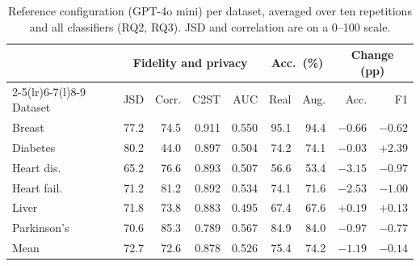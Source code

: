 \documentclass[conference]{IEEEtran}
\providecommand{\DIFaddbeginFL}{} %
\providecommand{\DIFaddendFL}{} %
\providecommand{\DIFdelbeginFL}{} %
\providecommand{\DIFdelendFL}{} %
\newcommand{\DIFscaledelfig}{0.5}
\newlength{\DIFdelgraphicswidth} %
\newlength{\DIFdelgraphicsheight} %
\newcommand{\DIFaddincludegraphics}[2][]{{\color{blue}\fbox{\DIFOincludegraphics[#1]{#2}}}} %
\newcommand{\DIFdelincludegraphics}[2][]{%
\sbox{\DIFdelgraphicsbox}{\DIFOincludegraphics[#1]{#2}}%
\settoboxwidth{\DIFdelgraphicswidth}{\DIFdelgraphicsbox} %
\settoboxtotalheight{\DIFdelgraphicsheight}{\DIFdelgraphicsbox} %
\scalebox{\DIFscaledelfig}{%
\parbox[b]{\DIFdelgraphicswidth}{\usebox{\DIFdelgraphicsbox}\\[-\baselineskip] \rule{\DIFdelgraphicswidth}{0em}}\llap{\resizebox{\DIFdelgraphicswidth}{\DIFdelgraphicsheight}{%
\setlength{\unitlength}{\DIFdelgraphicswidth}%
\begin{picture}(1,1)%
\thicklines\linethickness{2pt} %
{\color[rgb]{1,0,0}\put(0,0){\framebox(1,1){}}}%
{\color[rgb]{1,0,0}\put(0,0){\line( 1,1){1}}}%
{\color[rgb]{1,0,0}\put(0,1){\line(1,-1){1}}}%
\end{picture}%
}\hspace*{3pt}}} %
} %
\DeclareRobustCommand{\DIFaddbeginFL}{\DIFOaddbeginFL \let\includegraphics\DIFaddincludegraphics} %
\DeclareRobustCommand{\DIFaddendFL}{\DIFOaddendFL \let\includegraphics\DIFOincludegraphics} %
\DeclareRobustCommand{\DIFdelbeginFL}{\DIFOdelbeginFL \let\includegraphics\DIFdelincludegraphics} %
\DeclareRobustCommand{\DIFdelendFL}{\DIFOaddendFL \let\includegraphics\DIFOincludegraphics} %
\begin{document}
\begin{table}[t]
\centering
\caption{Reference configuration (GPT-4o mini) per dataset, averaged over ten repetitions and all classifiers (RQ2, RQ3). JSD and correlation are on a 0--100 scale.}
\label{tab:full}
\footnotesize
\setlength{\tabcolsep}{2.2pt}
\DIFdelbeginFL %
\DIFdelendFL \DIFaddbeginFL \begin{tabular*}{\columnwidth}{@{\extracolsep{\fill}}lrrrrrrrr@{}}
\toprule
& \multicolumn{4}{c}{Fidelity and privacy} & \multicolumn{2}{c}{Acc.\ (\%)} & \multicolumn{2}{c}{Change (pp)} \\
\cmidrule(lr){2-5}\cmidrule(lr){6-7}\cmidrule(l){8-9}
Dataset & JSD & Corr. & C2ST & AUC & Real & Aug. & Acc. & F1 \\
\midrule
Breast & 77.2 & 74.5 & 0.911 & 0.550 & 95.1 & 94.4 & $-0.66$ & $-0.62$ \\
Diabetes & 80.2 & 44.0 & 0.897 & 0.504 & 74.2 & 74.1 & $-0.03$ & $+2.39$ \\
Heart dis. & 65.2 & 76.6 & 0.893 & 0.507 & 56.6 & 53.4 & $-3.15$ & $-0.97$ \\
Heart fail. & 71.2 & 81.2 & 0.892 & 0.534 & 74.1 & 71.6 & $-2.53$ & $-1.00$ \\
Liver & 71.8 & 73.8 & 0.883 & 0.495 & 67.4 & 67.6 & $+0.19$ & $+0.13$ \\
Parkinson's & 70.6 & 85.3 & 0.789 & 0.567 & 84.9 & 84.0 & $-0.97$ & $-0.77$ \\
\midrule
Mean & 72.7 & 72.6 & 0.878 & 0.526 & 75.4 & 74.2 & $-1.19$ & $-0.14$ \\
\bottomrule
\end{tabular*}
\DIFaddendFL \end{table}
\end{document}

